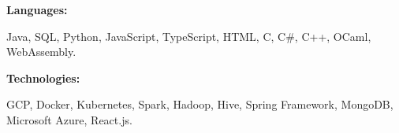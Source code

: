 \documentclass[9pt]{developercv} %
\begin{document}
\begin{minipage}[t]{0.46\textwidth}
   

\end{minipage}
\hfill %
\begin{minipage}[t]{0.465\textwidth}
    \vspace{-6pt}
    
    \begin{minipage}[t]{0.2\textwidth}
        \textbf{Languages:}
    \end{minipage}
    \hfill
    \begin{minipage}[t]{0.73\textwidth}
        Java, SQL, Python, JavaScript, TypeScript, HTML, C, C\#, C++, OCaml, WebAssembly.
    \end{minipage}
    \vspace{4mm}
    
    \begin{minipage}[t]{0.2\textwidth}
        \textbf{Technologies:}
    \end{minipage}
    \hfill
    \begin{minipage}[t]{0.73\textwidth}
        GCP, Docker, Kubernetes, Spark, Hadoop, Hive, Spring Framework, MongoDB, Microsoft Azure, React.js.
    \end{minipage}
    \vspace{4mm}

\end{minipage}
\end{document}
